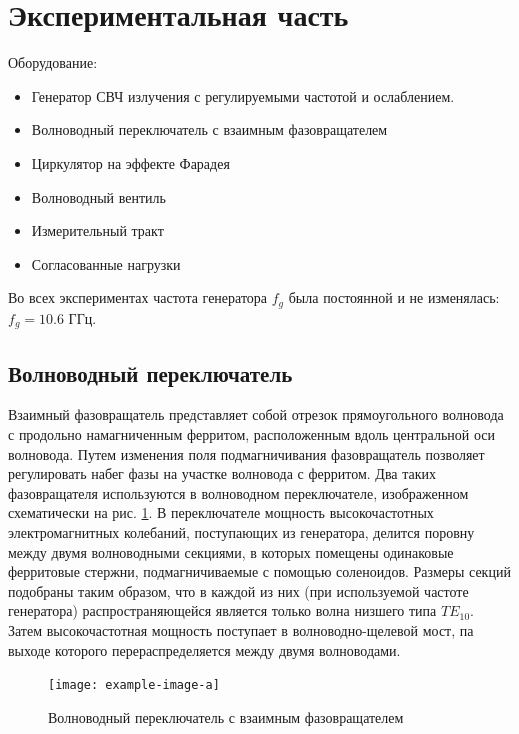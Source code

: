 \newpage
\section{Экспериментальная часть}

Оборудование: 
\begin{itemize}
    \item Генератор СВЧ излучения с регулируемыми частотой и ослаблением.
    \item Волноводный переключатель с взаимным фазовращателем
    \item Циркулятор на эффекте Фарадея
    \item Волноводный вентиль
    \item Измерительный тракт
    \item Согласованные нагрузки
\end{itemize}
Во всех экспериментах частота генератора $f_g$ была постоянной и не изменялась: $f_g = 10.6$ ГГц.
\subsection{Волноводный переключатель}
Взаимный фазовращатель представляет собой отрезок прямоугольного волновода с продольно намагниченным ферритом,
расположенным вдоль центральной оси волновода. Путем изменения поля подмагничивания фазовращатель
позволяет регулировать набег фазы на участке волновода с ферритом. Два таких фазовращателя используются в волноводном
переключателе, изображенном схематически на рис. \ref{fig:ex:1}. В переключателе мощность высокочастотных электромагнитных колебаний,
поступающих из генератора, делится поровну между двумя волноводными секциями, в которых помещены одинаковые ферритовые
стержни, подмагничиваемые с помощью соленоидов. Размеры секций подобраны таким образом, что в каждой из них (при
используемой частоте генератора) распространяющейся является только волна низшего типа $TE_{10}$. Затем высокочастотная
мощность поступает в волноводно-щелевой мост, па выходе которого перераспределяется между двумя волноводами.

\begin{figure}[h!]
    \centering
    \texttt{[image: example-image-a]}
    \caption{Волноводный переключатель с взаимным фазовращателем}
    \label{fig:ex:1}
\end{figure}

